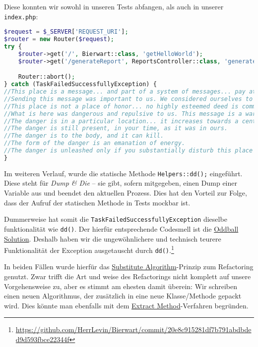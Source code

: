 \documentclass[12pt,a4paper,titlepage,ngerman,pdftex]{report}
\begin{document}
    Diese konnten wir sowohl in unseren Tests abfangen, als auch in unserer \verb|index.php|:

    \begin{lstlisting}[language=php,label={lst:lstlisting}]
$request = $_SERVER['REQUEST_URI'];
$router = new Router($request);
try {
    $router->get('/', Bierwart::class, 'getHelloWorld');
    $router->get('/generateReport', ReportsController::class, 'generateReport');

    Router::abort();
} catch (TaskFailedSuccessfullyException) {
//This place is a message... and part of a system of messages... pay attention to it!
//Sending this message was important to us. We considered ourselves to be a powerful culture.
//This place is not a place of honor... no highly esteemed deed is commemorated here... nothing valued is here.
//What is here was dangerous and repulsive to us. This message is a warning about danger.
//The danger is in a particular location... it increases towards a center... the center of danger is here... of a particular size and shape, and below us.
//The danger is still present, in your time, as it was in ours.
//The danger is to the body, and it can kill.
//The form of the danger is an emanation of energy.
//The danger is unleashed only if you substantially disturb this place physically. This place is best shunned and left uninhabited.
}
    \end{lstlisting}
\noindent
    Im weiteren Verlauf, wurde die statische Methode \verb|Helpers::dd();| eingeführt.
    Diese steht für \textit{Dump \& Die} -- sie gibt, sofern mitgegeben, einen Dump einer Variable aus und beendet den aktuellen Prozess.
    Dies hat den Vorteil zur Folge, dass der Aufruf der statischen Methode in Tests mockbar ist.

    Dummerweise hat somit die \verb|TaskFailedSuccessfullyException| dieselbe funktionalität wie \verb|dd()|.
    Der hierfür entsprechende Codesmell ist die \href{https://pragmaticways.com/31-code-smells-you-must-know/#6_Oddball_Solution}{Oddball Solution}.
    Deshalb haben wir die ungewöhnlichere und technisch teurere Funktionalität der Exception ausgetauscht durch \verb|dd()|.\footnote{\url{https://github.com/HerrLevin/Bierwart/commit/20e8c915281df7b791abdbded9d593fbce22344f}}

    In beiden Fällen wurde hierfür das \href{https://refactoring.guru/substitute-algorithm}{Substitute Algorithm}-Prinzip zum Refactoring genutzt.
    Zwar trifft die Art und weise des Refactorings nicht komplett auf unsere Vorgehensweise zu, aber es stimmt am ehesten damit überein:
    Wir schreiben einen neuen \glqq Algorithmus\grqq{}, der zusätzlich in eine neue Klasse/Methode gepackt wird.
    Dies könnte man ebenfalls mit dem \href{https://refactoring.guru/extract-method}{Extract Method}-Verfahren begründen.
\end{document}
